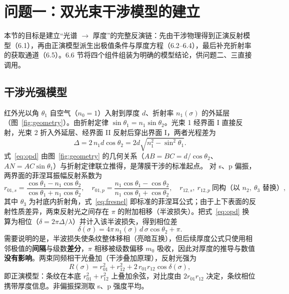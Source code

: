 \documentclass[11pt,a4paper,fontset=fandol]{ctexart}
\begin{document}
\section{问题一：双光束干涉模型的建立}\label{sec:q1}

本节的目标是建立``光谱 $\to$ 厚度''的完整反演链：先由干涉物理得到正演反射模型（6.1），再由正演模型派生出极值条件与厚度方程（6.2--6.4），最后补充折射率的获取通道（6.5）。6.6 节将四个组件组装为明确的模型结论，供问题二、三直接调用。

\subsection{干涉光强模型}

红外光以角 $\theta_1$ 自空气（$n_0=1$）入射到厚度 $d$、折射率 $n_1(\sigma)$ 的外延层（图~\ref{fig:geometry}）。由折射定律 $\sin\theta_1=n_1\sin\theta_2$。光束 1 经界面 I 直接反射，光束 2 折入外延层、经界面 II 反射后穿出界面 I，两者光程差为
\begin{equation}
    \Delta = 2\,n_1 d\cos\theta_2 = 2d\sqrt{n_1^2-\sin^2\theta_1}.
    \label{eq:opd}
\end{equation}
式~\eqref{eq:opd} 由图~\ref{fig:geometry} 的几何关系（$AB=BC=d/\cos\theta_2$、$AN=AC\sin\theta_1$）与折射定律联立推得，是薄膜干涉的标准起点\cite{you2003}。
对 s、p 偏振，两界面的菲涅耳振幅反射系数为
\begin{equation}
    r_{01,s}=\frac{\cos\theta_1-n_1\cos\theta_2}{\cos\theta_1+n_1\cos\theta_2},\quad
    r_{01,p}=\frac{n_1\cos\theta_1-\cos\theta_2}{n_1\cos\theta_1+\cos\theta_2},\quad
    r_{12,s},\ r_{12,p}\ \text{同构（以 } n_2,\ \theta_3 \text{ 替换）},
    \label{eq:fresnel}
\end{equation}
其中 $\theta_3$ 为衬底内折射角，式~\eqref{eq:fresnel} 即标准的菲涅耳公式\cite{you2003}；由于上下表面的反射性质差异，两束反射光之间存在 $\pi$ 的附加相移（半波损失）。把式~\eqref{eq:opd} 换算为相位（$\delta=2\pi\Delta/\lambda$）并计入该半波损失，得到相位差
\begin{equation}
    \delta(\sigma) = 4\pi\, n_1(\sigma)\, d\,\sigma\cos\theta_2 + \pi .
    \label{eq:phase}
\end{equation}
需要说明的是，半波损失使条纹整体移相（亮暗互换），但后续厚度公式只使用相邻极值的\textbf{间隔}与级数\textbf{差分}，$\pi$ 相移被级数偏移 $m_0$ 吸收，因此对厚度的推导与数值\textbf{没有影响}\cite{xue2026,you2003}。两束同频相干光叠加（干涉叠加原理\cite{you2003}），反射光强为
\begin{equation}
    R(\sigma) = r_{01}^2 + r_{12}^2 + 2\,r_{01}r_{12}\cos\delta(\sigma),
    \label{eq:intensity}
\end{equation}
即正演模型：条纹在本底 $r_{01}^2+r_{12}^2$ 上叠加余弦，对比度由 $2r_{01}r_{12}$ 决定，条纹相位携带厚度信息。非偏振探测取 s、p 强度平均。
\end{document}
